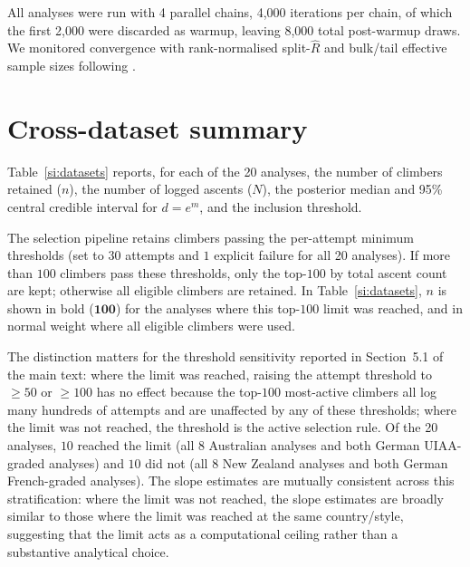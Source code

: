 \documentclass[11pt]{article}
\begin{document}
All analyses were run with 4 parallel chains, 4{,}000 iterations per chain, of which the first 2{,}000 were discarded as warmup, leaving 8{,}000 total post-warmup draws. We monitored convergence with rank-normalised split-$\hat{R}$ and bulk/tail effective sample sizes following \citet{vehtari2021rank}.


\section{Cross-dataset summary}
\label{si:cross-dataset}

Table~\ref{si:datasets} reports, for each of the 20 analyses, the number of climbers retained ($n$), the number of logged ascents ($N$), the posterior median and 95\% central credible interval for $d = e^m$, and the inclusion threshold.

The selection pipeline retains climbers passing the per-attempt minimum thresholds (set to $30$ attempts and $1$ explicit failure for all 20 analyses). If more than $100$ climbers pass these thresholds, only the top-$100$ by total ascent count are kept; otherwise all eligible climbers are retained. In Table~\ref{si:datasets}, $n$ is shown in bold ($\mathbf{100}$) for the analyses where this top-$100$ limit was reached, and in normal weight where all eligible climbers were used.

The distinction matters for the threshold sensitivity reported in Section~5.1 of the main text: where the limit was reached, raising the attempt threshold to $\geq\!50$ or $\geq\!100$ has no effect because the top-$100$ most-active climbers all log many hundreds of attempts and are unaffected by any of these thresholds; where the limit was not reached, the threshold is the active selection rule. Of the 20 analyses, $10$ reached the limit (all 8 Australian analyses and both German UIAA-graded analyses) and $10$ did not (all 8 New Zealand analyses and both German French-graded analyses). The slope estimates are mutually consistent across this stratification: where the limit was not reached, the slope estimates are broadly similar to those where the limit was reached at the same country/style, suggesting that the limit acts as a computational ceiling rather than a substantive analytical choice.
\end{document}
